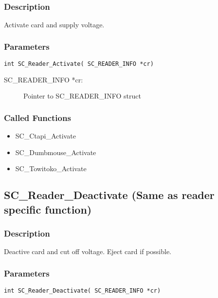 \documentclass[a4paper,oneside]{article}
\begin{document}
\subsubsection*{Description}

Activate card and supply voltage.

\subsubsection*{Parameters}

\begin{verbatim}
int SC_Reader_Activate( SC_READER_INFO *cr)
\end{verbatim}

\begin{description}
\item[SC\_READER\_INFO *cr:] Pointer to SC\_READER\_INFO struct
\end{description}

\subsubsection*{Called Functions}

\begin{itemize}
\item SC\_Ctapi\_Activate
\item SC\_Dumbmouse\_Activate
\item SC\_Towitoko\_Activate
\end{itemize}


\subsection{SC\_Reader\_Deactivate (Same as reader specific function)}

\subsubsection*{Description}

Deactive card and cut off voltage. Eject card if possible.

\subsubsection*{Parameters}

\begin{verbatim}
int SC_Reader_Deactivate( SC_READER_INFO *cr)
\end{verbatim}
\end{document}
